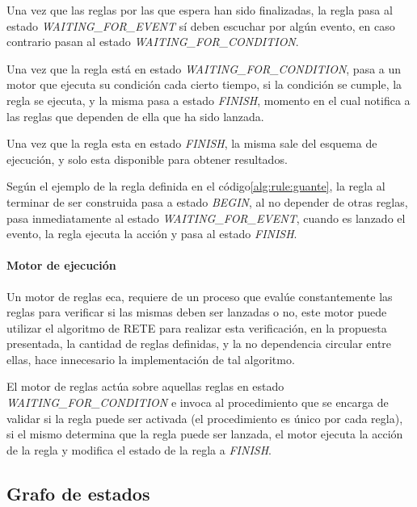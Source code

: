 Una vez que las reglas por las que espera han sido finalizadas, la regla pasa al estado
\emph{WAITING\_FOR\_EVENT} sí deben escuchar por algún evento, en caso contrario
pasan al estado \emph{WAITING\_FOR\_CONDITION}.

Una vez que la regla está en estado \emph{WAITING\_FOR\_CONDITION}, pasa a un
motor que ejecuta su condición cada cierto tiempo, si la condición se cumple, la
regla se ejecuta, y la misma pasa a estado \emph{FINISH}, momento en el cual
notifica a las reglas que dependen de ella que ha sido lanzada.

Una vez que la regla esta en estado \emph{FINISH}, la misma sale del esquema de
ejecución, y solo esta disponible para obtener resultados.

Según el ejemplo de la regla definida en el código\ref{alg:rule:guante}, la
regla al terminar de ser construida pasa a estado \emph{BEGIN}, al no depender
de otras reglas, pasa inmediatamente al estado \emph{WAITING\_FOR\_EVENT},
cuando es lanzado el evento, la regla ejecuta la acción y pasa al estado
\emph{FINISH}.

\paragraph{Motor de ejecución}

Un motor de reglas \gls{eca}, requiere de un proceso que evalúe constantemente
las reglas para verificar si las mismas deben ser lanzadas o
no\cite{bailey2004event,galton2002two}, este motor puede utilizar el algoritmo
de RETE\cite{de2001eca} para realizar esta verificación, en la propuesta
presentada, la cantidad de reglas definidas, y la no dependencia circular entre
ellas, hace innecesario la implementación de tal algoritmo\cite{de2001eca}. 

El motor de reglas actúa sobre aquellas reglas en estado
\emph{WAITING\_FOR\_CONDITION} e invoca al procedimiento que se encarga de
validar si la regla puede ser activada (el procedimiento es único por cada
regla), si el mismo determina que la regla puede ser lanzada, el motor ejecuta
la acción de la regla y modifica el estado de la regla a \emph{FINISH}.


\subsection{Grafo de estados}


